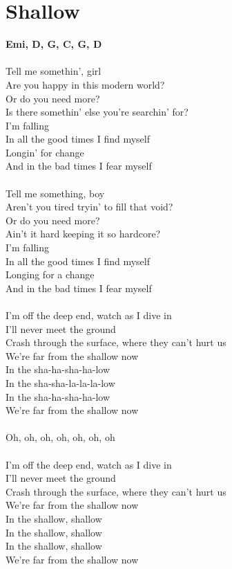 \section{Shallow}
\footnotesize\textbf{Emi, D, G, C, G, D}\\
\\
\normalsize
Tell me somethin', girl\\
Are you happy in this modern world?\\
Or do you need more?\\
Is there somethin' else you're searchin' for?\\
I'm falling\\
In all the good times I find myself\\
Longin' for change\\
And in the bad times I fear myself\\
\\
Tell me something, boy\\
Aren't you tired tryin' to fill that void?\\
Or do you need more?\\
Ain't it hard keeping it so hardcore?\\
I'm falling\\
In all the good times I find myself\\
Longing for a change\\
And in the bad times I fear myself\\
\\
I'm off the deep end, watch as I dive in\\
I'll never meet the ground\\
Crash through the surface, where they can't hurt us\\
We're far from the shallow now\\
In the sha-ha-sha-ha-low\\
In the sha-sha-la-la-la-low\\
In the sha-ha-sha-ha-low\\
We're far from the shallow now\\
\\
Oh, oh, oh, oh, oh, oh, oh\\
\\
I'm off the deep end, watch as I dive in\\
I'll never meet the ground\\
Crash through the surface, where they can't hurt us\\
We're far from the shallow now\\
In the shallow, shallow\\
In the shallow, shallow\\
In the shallow, shallow\\
We're far from the shallow now\\